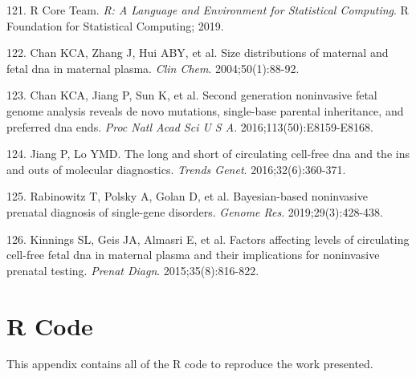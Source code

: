 \documentclass[11pt,letterpaper]{book}
\begin{document}
\leavevmode\hypertarget{ref-r-core-team:2019aa}{}%
121. R Core Team. \emph{R: A Language and Environment for Statistical Computing}. R Foundation for Statistical Computing; 2019.

\leavevmode\hypertarget{ref-chan:2004aa}{}%
122. Chan KCA, Zhang J, Hui ABY, et al. Size distributions of maternal and fetal dna in maternal plasma. \emph{Clin Chem}. 2004;50(1):88-92.

\leavevmode\hypertarget{ref-chan:2016aa}{}%
123. Chan KCA, Jiang P, Sun K, et al. Second generation noninvasive fetal genome analysis reveals de novo mutations, single-base parental inheritance, and preferred dna ends. \emph{Proc Natl Acad Sci U S A}. 2016;113(50):E8159-E8168.

\leavevmode\hypertarget{ref-jiang:2016ab}{}%
124. Jiang P, Lo YMD. The long and short of circulating cell-free dna and the ins and outs of molecular diagnostics. \emph{Trends Genet}. 2016;32(6):360-371.

\leavevmode\hypertarget{ref-rabinowitz:2019aa}{}%
125. Rabinowitz T, Polsky A, Golan D, et al. Bayesian-based noninvasive prenatal diagnosis of single-gene disorders. \emph{Genome Res}. 2019;29(3):428-438.

\leavevmode\hypertarget{ref-kinnings:2015aa}{}%
126. Kinnings SL, Geis JA, Almasri E, et al. Factors affecting levels of circulating cell-free fetal dna in maternal plasma and their implications for noninvasive prenatal testing. \emph{Prenat Diagn}. 2015;35(8):816-822.

\hypertarget{appendix-appendix}{%
\appendix}


\hypertarget{r-code}{%
\chapter{R Code}\label{r-code}}

This appendix contains all of the R code to reproduce the work presented.
\end{document}
